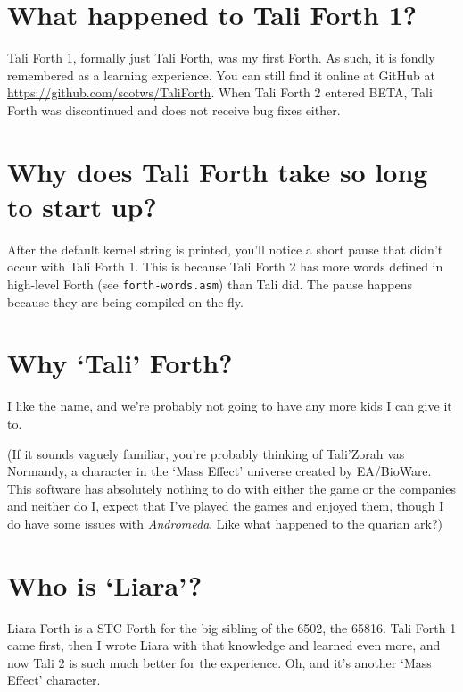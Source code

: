 \section{What happened to Tali Forth 1?} 

Tali Forth 1, formally just Tali Forth, was my first Forth.
As such, it is fondly remembered as a learning experience. You can still find it
online at GitHub at
\href{https://github.com/scotws/TaliForth}{https://github.com/scotws/TaliForth}.
When Tali Forth 2 entered BETA, Tali Forth was discontinued and does not receive
bug fixes either.

\section{Why does Tali Forth take so long to start up?}

After the default kernel string is printed, you'll notice a short pause that
didn't occur with Tali Forth 1. This is because Tali Forth 2 has more words
defined in high-level Forth (see \texttt{forth-words.asm}) than Tali did. The
pause happens because they are being compiled on the fly.

\section{Why `Tali' Forth?}

I like the name, and we're probably not going to have any more kids I can give
it to.

(If it sounds vaguely familiar, you're probably thinking of Tali'Zorah vas
Normandy, a character in the `Mass
Effect' universe created by EA/BioWare.  This
software has absolutely nothing to do with either the game or the companies and
neither do I, expect that I've played the games and enjoyed them, though I do
have some issues with \emph{Andromeda}. Like what happened to the quarian ark?)

\section{Who is `Liara'?}

Liara Forth is a STC Forth for the big sibling of the 6502, the
65816. Tali Forth 1 came first, then I wrote
Liara with that knowledge and learned even more, and now Tali 2 is such much
better for the experience. Oh, and it's another `Mass Effect' character.

